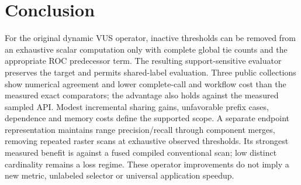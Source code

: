 \section{Conclusion}
For the original dynamic VUS operator, inactive thresholds can be removed from
an exhaustive scalar computation only with complete global tie counts and the
appropriate ROC predecessor term. The resulting support-sensitive evaluator
preserves the target and permits shared-label evaluation. Three public
collections show numerical agreement and lower complete-call and workflow
cost than the measured exact comparators; the advantage also holds against the
measured sampled API. Modest incremental sharing gains, unfavorable prefix
cases, dependence and memory costs define the supported scope. A separate
endpoint representation maintains range precision/recall through component
merges, removing repeated raster scans at exhaustive observed thresholds.
Its strongest measured benefit is against a fused compiled conventional scan;
low distinct cardinality remains a loss regime. These operator improvements do
not imply a new metric, unlabeled selector or universal application speedup.
